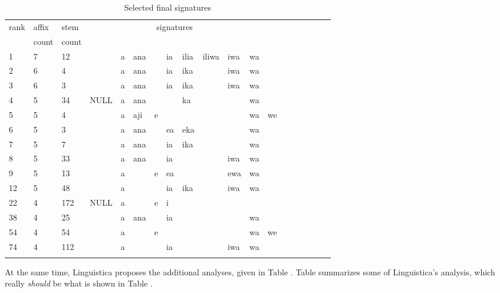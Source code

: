 \documentclass[output=paper,colorlinks,citecolor=brown,
]{langscibook}
\begin{document}
\begin{table}
\begin{tabular}{lllllllllllllllllll}\lsptoprule
rank& affix & stem   & \multicolumn{9}{c}{signatures} \\ 
 &   count & count & \\ \midrule
1 & 7 & 12 &     & a & ana && ia & ilia & iliwa & iwa & wa   \\
2 & 6&   4  &     & a & ana && ia & ika & & iwa &wa \\
3 & 6& 3  &     & a & ana && ia &ika  & & iwa& wa \\
4 & 5 & 34 & NULL& a & ana && & ka &     & &   wa \\
5 & 5 & 4  &     & a & aji & e & & & && wa & we \\
6 & 5 & 3 &      & a & ana && ea & eka &&& wa \\
7 & 5 & 7 &      & a & ana && ia & 	ika &&& wa \\
8 & 5 & 33 &     & a  & ana &&ia &&& iwa & wa  \\
9 & 5 & 13 &     & a  && e & ea &&& ewa & wa \\ 
12 &5 & 48 & &a &&&ia &ika &&iwa &wa \\
22 & 4 &172 & NULL & a&& e& i \\
38 & 4 &25 &&    a & ana&&  ia&&&&  wa \\
54 & 4 & 54 & & a &&e &&&&&wa & we \\
74 & 4 &  112 && a&&& ia&&& iwa& wa \\
  \lspbottomrule
\end{tabular}
\caption{Selected final signatures}
\label{final-sigs-2}
\end{table}



At the same time, Linguistica proposes the additional analyses, given in Table . Table  summarizes some of Linguistica's 
analysis, which really {\em should} be what is shown in Table .
\end{document}
